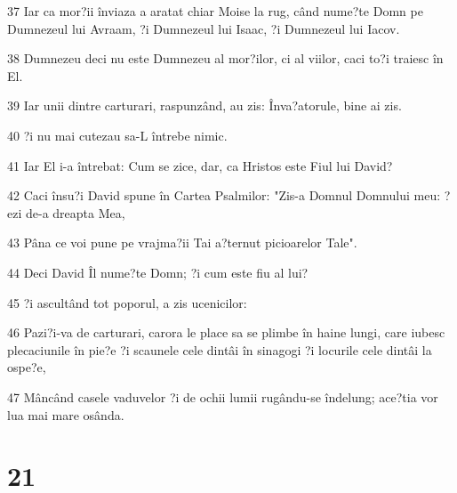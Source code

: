 \par 37 Iar ca mor?ii înviaza a aratat chiar Moise la rug, când nume?te Domn pe Dumnezeul lui Avraam, ?i Dumnezeul lui Isaac, ?i Dumnezeul lui Iacov.
\par 38 Dumnezeu deci nu este Dumnezeu al mor?ilor, ci al viilor, caci to?i traiesc în El.
\par 39 Iar unii dintre carturari, raspunzând, au zis: Înva?atorule, bine ai zis.
\par 40 ?i nu mai cutezau sa-L întrebe nimic.
\par 41 Iar El i-a întrebat: Cum se zice, dar, ca Hristos este Fiul lui David?
\par 42 Caci însu?i David spune în Cartea Psalmilor: "Zis-a Domnul Domnului meu: ?ezi de-a dreapta Mea,
\par 43 Pâna ce voi pune pe vrajma?ii Tai a?ternut picioarelor Tale".
\par 44 Deci David Îl nume?te Domn; ?i cum este fiu al lui?
\par 45 ?i ascultând tot poporul, a zis ucenicilor:
\par 46 Pazi?i-va de carturari, carora le place sa se plimbe în haine lungi, care iubesc plecaciunile în pie?e ?i scaunele cele dintâi în sinagogi ?i locurile cele dintâi la ospe?e,
\par 47 Mâncând casele vaduvelor ?i de ochii lumii rugându-se îndelung; ace?tia vor lua mai mare osânda.

\chapter{21}

